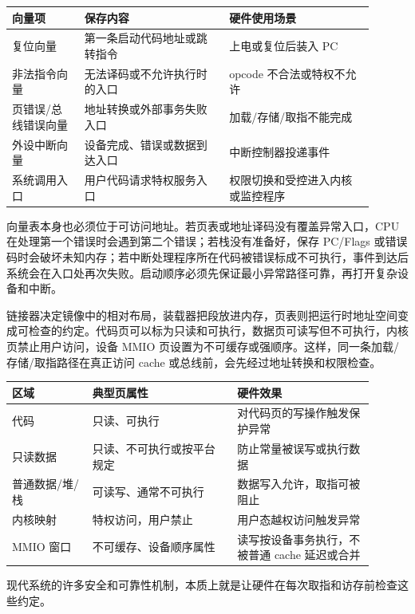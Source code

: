 \begin{longtable}{L{0.18\linewidth}L{0.36\linewidth}L{0.36\linewidth}}
\toprule
向量项 & 保存内容 & 硬件使用场景 \\
\midrule
复位向量 & 第一条启动代码地址或跳转指令 & 上电或复位后装入 PC \\\tablerowrule
非法指令向量 & 无法译码或不允许执行时的入口 & opcode 不合法或特权不允许 \\\tablerowrule
页错误/总线错误向量 & 地址转换或外部事务失败入口 & 加载/存储/取指不能完成 \\\tablerowrule
外设中断向量 & 设备完成、错误或数据到达入口 & 中断控制器投递事件 \\\tablerowrule
系统调用入口 & 用户代码请求特权服务入口 & 权限切换和受控进入内核或监控程序 \\
\bottomrule
\end{longtable}

向量表本身也必须位于可访问地址。若页表或地址译码没有覆盖异常入口，CPU 在处理第一个错误时会遇到第二个错误；若栈没有准备好，保存 PC/Flags 或错误码时会破坏未知内存；若中断处理程序所在代码被错误标成不可执行，事件到达后系统会在入口处再次失败。启动顺序必须先保证最小异常路径可靠，再打开复杂设备和中断。

链接器决定镜像中的相对布局，装载器把段放进内存，页表则把运行时地址空间变成可检查的约定。代码页可以标为只读和可执行，数据页可读写但不可执行，内核页禁止用户访问，设备 MMIO 页设置为不可缓存或强顺序。这样，同一条加载/存储/取指路径在真正访问 cache 或总线前，会先经过地址转换和权限检查。

\begin{longtable}{L{0.2\linewidth}L{0.36\linewidth}L{0.34\linewidth}}
\toprule
区域 & 典型页属性 & 硬件效果 \\
\midrule
代码 & 只读、可执行 & 对代码页的写操作触发保护异常 \\\tablerowrule
只读数据 & 只读、不可执行或按平台规定 & 防止常量被误写或执行数据 \\\tablerowrule
普通数据/堆/栈 & 可读写、通常不可执行 & 数据写入允许，取指可被阻止 \\\tablerowrule
内核映射 & 特权访问，用户禁止 & 用户态越权访问触发异常 \\\tablerowrule
MMIO 窗口 & 不可缓存、设备顺序属性 & 读写按设备事务执行，不被普通 cache 延迟或合并 \\
\bottomrule
\end{longtable}

现代系统的许多安全和可靠性机制，本质上就是让硬件在每次取指和访存前检查这些约定。

